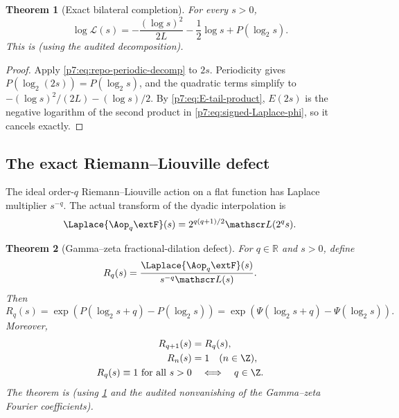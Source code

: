 \documentclass[11pt,oneside]{article}
\newtheorem{theorem}{Theorem}[section]
\theoremstyle{definition}
\theoremstyle{remark}
\newcommand{\R}{\mathbb R}
\newcommand{\1}{\mathbf 1}
\begin{document}
\begin{theorem}[Exact bilateral completion]
\label{p7:thm:exact-periodic-completion}
For every $s>0$,
\begin{equation}
 \boxed{
 \log\mathscr L(s)
 =-\frac{(\log s)^2}{2L}-\frac12\log s+P(\log_2s).}
 \label{p7:eq:exact-signed-log}
\end{equation}
This is \statusderived{} (using the audited decomposition).
\end{theorem}

\begin{proof}
Apply \cref{p7:eq:repo-periodic-decomp} to $2s$.  Periodicity gives
$P(\log_2(2s))=P(\log_2s)$, and the quadratic terms simplify to
$-(\log s)^2/(2L)-(\log s)/2$.  By \cref{p7:eq:E-tail-product},
$E(2s)$ is the negative logarithm of the second product in
\cref{p7:eq:signed-Laplace-phi}, so it cancels exactly.
\end{proof}

\subsection{The exact Riemann--Liouville defect}

The ideal order-$q$ Riemann--Liouville action on a flat function has Laplace multiplier
$s^{-q}$.  The actual transform of the dyadic interpolation is
\begin{equation}
 \Laplace\{\Aop_q\extF\}(s)
 =2^{q(q+1)/2}\mathscr L(2^qs).
 \label{p7:eq:Laplace-Appell}
\end{equation}

\begin{theorem}[Gamma--zeta fractional-dilation defect]
\label{p7:thm:fractional-defect}
For $q\in\R$ and $s>0$, define
\begin{equation}
 R_q(s)=
 \frac{\Laplace\{\Aop_q\extF\}(s)}{s^{-q}\mathscr L(s)}.
 \label{p7:eq:defect-def}
\end{equation}
Then
\begin{equation}
 \boxed{
 R_q(s)=\exp\!\left(P(\log_2s+q)-P(\log_2s)\right)
 =\exp\!\left(\Psi(\log_2s+q)-\Psi(\log_2s)\right).}
 \label{p7:eq:defect-exact}
\end{equation}
Moreover,
\begin{align}
 R_{q+1}(s)&=R_q(s),\label{p7:eq:defect-order-periodic}\\
 R_n(s)&=1\quad(n\in\Z),\label{p7:eq:defect-integer-zero}\\
 R_q(s)\equiv1\text{ for all }s>0
 &\quad\Longleftrightarrow\quad q\in\Z.
 \label{p7:eq:defect-rigidity}
\end{align}
The theorem is \statusderived{} (using \cref{p7:thm:exact-periodic-completion} and the audited
nonvanishing of the Gamma--zeta Fourier coefficients).
\end{theorem}
\end{document}
